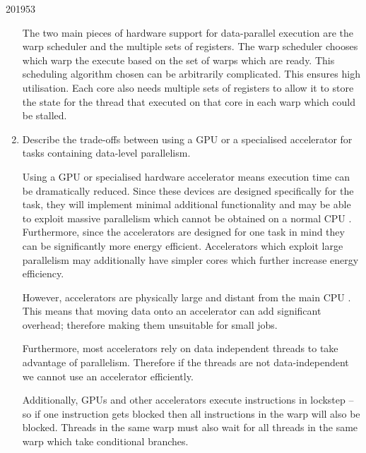 \documentclass[10pt,\jkfside,a4paper]{article}
\begin{document}
\begin{examquestion}{2019}{5}{3}
\begin{enumerate}[label=(\alph*)]
\begin{center}
\end{center}

The two main pieces of hardware support for data-parallel execution are the
warp scheduler and the multiple sets of registers. The warp scheduler
chooses which warp the execute based on the set of warps which are ready.
This scheduling algorithm chosen can be arbitrarily complicated. This
ensures high utilisation. Each core also needs multiple sets of registers to
allow it to store the state for the thread that executed on that core in each
warp which could be stalled.

\fi

\item Describe the trade-offs between using a GPU or a specialised
accelerator for tasks containing data-level parallelism.

Using a GPU or specialised hardware accelerator means execution time can be
dramatically reduced. Since these devices are designed specifically for the
task, they will implement minimal additional functionality and may be able
to exploit massive parallelism which cannot be obtained on a normal CPU .
Furthermore, since the accelerators are designed for one task in mind they can
be significantly more energy efficient. Accelerators which exploit large
parallelism may additionally have simpler cores which further increase
energy efficiency.

However, accelerators are physically large and distant from the main CPU .
This means that moving data onto an accelerator can add significant overhead;
therefore making them unsuitable for small jobs.

Furthermore, most accelerators rely on data independent threads to take
advantage of parallelism. Therefore if the threads are not data-independent
we cannot use an accelerator efficiently.

Additionally, GPUs and other accelerators execute instructions in lockstep --
so if one instruction gets blocked then all instructions in the warp will
also be blocked. Threads in the same warp must also wait for all threads in
the same warp which take conditional branches.

\end{enumerate}

\end{examquestion}
\end{document}
